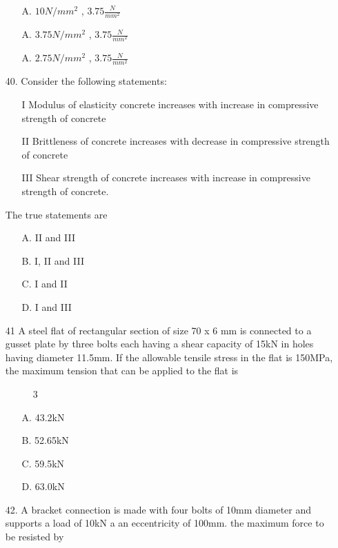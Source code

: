 \documentclass[journal]{IEEEtran}
\begin{document}
\begin{enumerate}
\begin{enumerate}
    \item [A.] $10N/mm^2$ , $3.75\frac{N}{mm^2}$
    \item [A.] $3.75N/mm^2$ , $3.75\frac{N}{mm^2}$ 
    \item [A.] $2.75N/mm^2$ , $3.75\frac{N}{mm^2}$ 
  \end{enumerate}
  \item[40.] Consider the following statements: 
  \begin{enumerate}
    \item [I] Modulus of elasticity concrete increases with increase in compressive
    strength of concrete
    \item [II] Brittleness of concrete increases with decrease in compressive strength of
    concrete
    \item [III] Shear strength of concrete increases with increase in compressive strength
    of concrete. 
  \end{enumerate}
  The true statements are 
  \begin{enumerate}
    \item [A.] II and III
    \item [B.] I, II and III
    \item [C.] I and II
    \item [D.] I and III
  \end{enumerate}
  \item[41]  A steel flat of rectangular section of size 70 x 6 mm is connected to a gusset plate
  by three bolts each having a shear capacity of 15kN in holes having diameter
  11.5mm. If the allowable tensile stress in the flat is 150MPa, the maximum
  tension that can be applied to the flat is
  \begin{figure}[!ht]
    \centering
    \caption{3 }
    \label{3 }
  \end{figure}
  \begin{enumerate}
    \item [A.] 43.2kN
    \item [B.] 52.65kN
    \item [C.] 59.5kN
    \item [D.] 63.0kN
  \end{enumerate}
  \item[42.] A bracket connection is made with four bolts of 10mm diameter and supports a
  load of 10kN a an eccentricity of 100mm. the maximum force to be resisted by

\end{enumerate}
\end{document}
